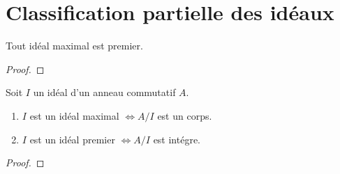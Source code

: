 

\section{Classification partielle des idéaux}


\begin{definition} 

\end{definition}

\begin{definition} 

\end{definition}

\begin{definition} 

\end{definition}

\begin{definition} [Corps]

\end{definition}

\begin{proposition}
	Tout idéal maximal est premier.
\end{proposition}

\ifdefined\outputproof
\begin{proof}

\end{proof}
\fi

\begin{proposition}
	Soit $I$ un idéal d'un anneau commutatif $A$.
	\begin{enumerate}
		\item $I$ est un idéal maximal $\Leftrightarrow A/I$ est un
			corps.
		\item $I$ est un idéal premier $\Leftrightarrow A/I$ est
			intégre.
	\end{enumerate}
\end{proposition}

\ifdefined\outputproof
\begin{proof}

\end{proof}
\fi

\begin{exemple}
\end{exemple}

